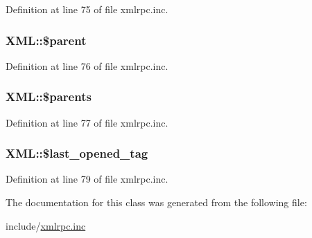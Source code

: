 Definition at line 75 of file xmlrpc.inc.\hypertarget{classXML_fa51193c2f0b317f817fa3efa8722227}{
\subsubsection{\setlength{\rightskip}{0pt plus 5cm}XML::\$parent}}
\label{classXML_fa51193c2f0b317f817fa3efa8722227}




Definition at line 76 of file xmlrpc.inc.\hypertarget{classXML_c10be009a77c59e80ce5562d4dd35532}{
\subsubsection{\setlength{\rightskip}{0pt plus 5cm}XML::\$parents}}
\label{classXML_c10be009a77c59e80ce5562d4dd35532}




Definition at line 77 of file xmlrpc.inc.\hypertarget{classXML_60e7e74df6643f50e0c6ea8252554b3d}{
\subsubsection{\setlength{\rightskip}{0pt plus 5cm}XML::\$last\_\-opened\_\-tag}}
\label{classXML_60e7e74df6643f50e0c6ea8252554b3d}




Definition at line 79 of file xmlrpc.inc.

The documentation for this class was generated from the following file:\begin{CompactItemize}
\item 
include/\hyperlink{xmlrpc_8inc}{xmlrpc.inc}\end{CompactItemize}
